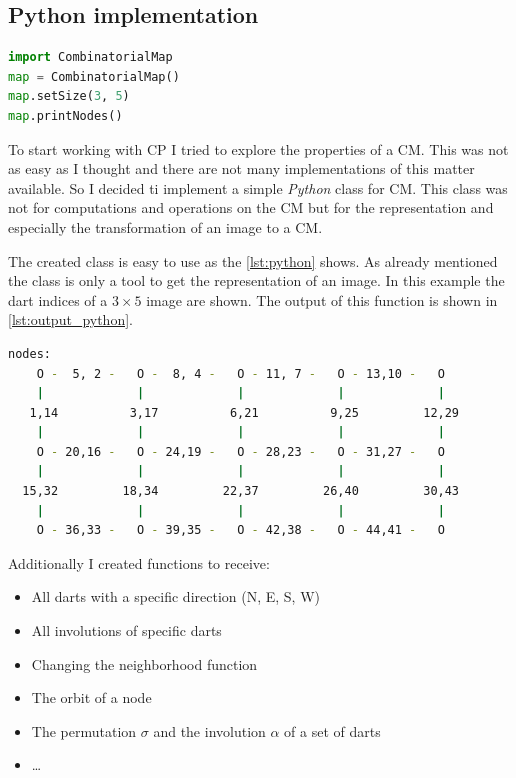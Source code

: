 \documentclass[12pt]{article}
\begin{document}

\subsection{Python implementation} %
\label{sub:python_implementation}

\begin{lstlisting}[caption={how to use the created \texttt{Python} class},label={lst:python},language=Python]
import CombinatorialMap
map = CombinatorialMap()
map.setSize(3, 5)
map.printNodes()
\end{lstlisting}

To start working with CP I tried to explore the properties of a CM\@. This was not as easy as I thought and there are not many implementations of this matter available. So I decided ti implement a simple \emph{Python} class for CM\@.
This class was not for computations and operations on the CM but for the representation and especially the transformation of an image to a CM\@.
\par
The created class is easy to use as the \cref{lst:python} shows. As already mentioned the class is only a tool to get the representation of an image. In this example the dart indices of a \( 3 \times 5 \) image are shown. The output of this function is shown in \cref{lst:output_python}.

\begin{lstlisting}[caption={The output of \cref{lst:python}},label={lst:output_python},language=bash,float,floatplacement=H,basicstyle=\scriptsize]
nodes:
    O -  5, 2 -   O -  8, 4 -   O - 11, 7 -   O - 13,10 -   O
    |             |             |             |             |
   1,14          3,17          6,21          9,25         12,29
    |             |             |             |             |
    O - 20,16 -   O - 24,19 -   O - 28,23 -   O - 31,27 -   O
    |             |             |             |             |
  15,32         18,34         22,37         26,40         30,43
    |             |             |             |             |
    O - 36,33 -   O - 39,35 -   O - 42,38 -   O - 44,41 -   O
\end{lstlisting}

Additionally I created functions to receive:
\begin{itemize}
  \item All darts with a specific direction (N, E, S, W)
  \item All involutions of specific darts
  \item Changing the neighborhood function
  \item The orbit of a node
  \item The permutation \( \sigma \) and the involution \( \alpha \) of a set of darts
  \item \ldots
\end{itemize}
\end{document}
